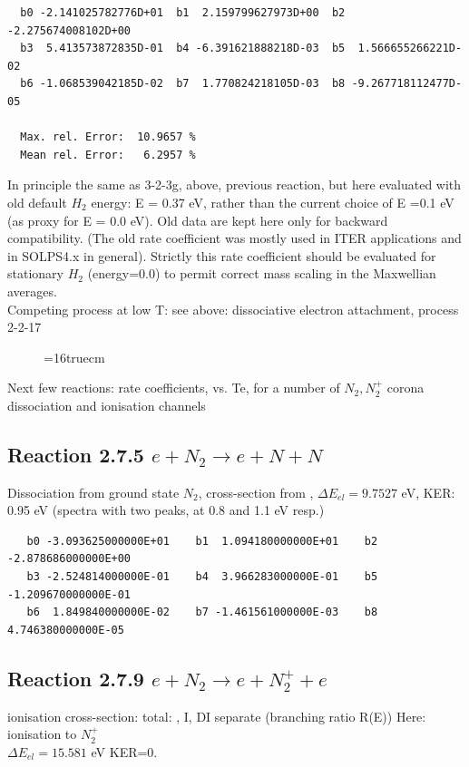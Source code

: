\documentclass[12pt,dvipdfmx]{article}
\begin{document}
\begin{small}\begin{verbatim}
  b0 -2.141025782776D+01  b1  2.159799627973D+00  b2 -2.275674008102D+00
  b3  5.413573872835D-01  b4 -6.391621888218D-03  b5  1.566655266221D-02
  b6 -1.068539042185D-02  b7  1.770824218105D-03  b8 -9.267718112477D-05

  Max. rel. Error:  10.9657 %
  Mean rel. Error:   6.2957 %
\end{verbatim}
\end{small}
In principle the same as 3-2-3g, above, previous reaction,
but here evaluated with old default $H_2$ energy: E = 0.37 eV, rather than
the current choice of E =0.1 eV (as proxy for E = 0.0 eV).
Old data are kept here only for backward compatibility.
(The old rate coefficient was mostly used in ITER applications
and in SOLPS4.x in general).
Strictly this rate coefficient should be evaluated for stationary $H_2$  (energy=0.0) to permit
correct mass scaling in the Maxwellian averages.
\\
Competing process at low T: see above: dissociative electron attachment, process 2-2-17

\begin{figure} \label{3.2.3g.old}
\epsfxsize=16truecm
\end{figure}
\newpage


Next few reactions:  rate coefficients, vs. Te, for a number of $N_2, N_2^+$ corona dissociation and ionisation channels
\subsection{
Reaction 2.7.5  $e + N_2 \rightarrow e + N + N$ }
Dissociation from ground state $N_2$, cross-section from \cite{kn:Cosby},
$\Delta E_{el} = 9.7527 $ eV, KER: 0.95 eV  (spectra with two peaks, at 0.8 and 1.1 eV resp.)


\begin{small}\begin{verbatim}
   b0 -3.093625000000E+01    b1  1.094180000000E+01    b2 -2.878686000000E+00
   b3 -2.524814000000E-01    b4  3.966283000000E-01    b5 -1.209670000000E-01
   b6  1.849840000000E-02    b7 -1.461561000000E-03    b8  4.746380000000E-05
\end{verbatim}\end{small}


\subsection{
Reaction 2.7.9  $e + N_2 \rightarrow e + N_2^+ + e$ }
ionisation cross-section: total: \cite{kn:Rapp1}, I, DI separate \cite{kn:Rapp2} (branching ratio R(E))
Here: ionisation to $N_2^+$ \\
$\Delta E_{el} = 15.581 $ eV KER=0.
\end{document}
